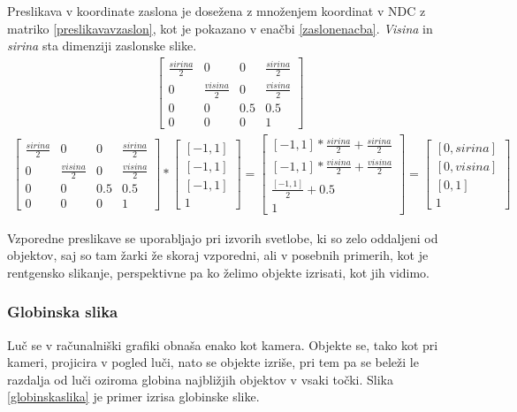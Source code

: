 \documentclass[a4paper, 12pt]{book}
\begin{document}
Preslikava v koordinate zaslona je dosežena z množenjem koordinat v NDC z matriko \ref{preslikavavzaslon}, kot je pokazano v enačbi \ref{zaslonenacba}. \emph{Visina} in \emph{sirina} sta dimenziji zaslonske slike.
\begin{align}
\begin{bmatrix}
\frac{sirina}{2} & 0 & 0 & \frac{sirina}{2}\\ 
0 & \frac{visina}{2} & 0 & \frac{visina}{2}\\ 
0 & 0 & 0.5 & 0.5 \\ 
0 & 0 & 0 & 1
\end{bmatrix}
\label{preslikavavzaslon}
\end{align}
\begin{align}
\begin{bmatrix}
\frac{sirina}{2} & 0 & 0 & \frac{sirina}{2}\\ 
0 & \frac{visina}{2} & 0 & \frac{visina}{2}\\ 
0 & 0 & 0.5 & 0.5 \\ 
0 & 0 & 0 & 1
\end{bmatrix}
*
\begin{bmatrix}
[-1, 1] \\ [-1, 1] \\ [-1, 1] \\ 1
\end{bmatrix}
=
\begin{bmatrix}
[-1, 1]*\frac{sirina}{2} + \frac{sirina}{2}\\
[-1, 1]*\frac{visina}{2} + \frac{visina}{2}\\
\frac{[-1, 1]}{2} + 0.5 \\
1
\end{bmatrix}
=
\begin{bmatrix}
[0, sirina] \\
[0, visina] \\
[0, 1] \\
1
\end{bmatrix}
\label{zaslonenacba}
\end{align}

Vzporedne preslikave se uporabljajo pri izvorih svetlobe, ki so zelo oddaljeni od objektov, saj so tam žarki že skoraj vzporedni, ali v posebnih primerih, kot je rentgensko slikanje, perspektivne pa ko želimo objekte izrisati, kot jih vidimo. 

\subsubsection*{Globinska slika}
Luč se v računalniški grafiki obnaša enako kot kamera. Objekte se, tako kot pri kameri, projicira v pogled luči, nato se objekte izriše, pri tem pa se beleži le razdalja od luči oziroma globina najbližjih objektov v vsaki točki. Slika \ref{globinskaslika} je primer izrisa globinske slike.
\end{document}
